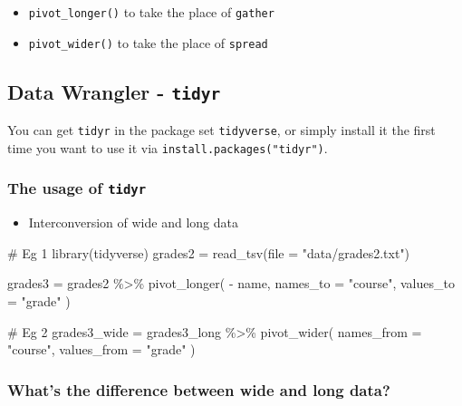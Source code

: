 \documentclass[
]{article}
\newenvironment{Shaded}{}{}
\newcommand{\NormalTok}[1]{#1}
\begin{document}
\begin{itemize}
\item
  \texttt{pivot\_longer()} to take the place of \texttt{gather}
\item
  \texttt{pivot\_wider()} to take the place of \texttt{spread}
\end{itemize}

\hypertarget{data-wrangler---tidyr}{%
\subsection{\texorpdfstring{Data Wrangler -
\texttt{tidyr}}{Data Wrangler - tidyr}}\label{data-wrangler---tidyr}}

You can get \texttt{tidyr} in the package set \texttt{tidyverse}, or
simply install it the first time you want to use it via
\texttt{install.packages("tidyr")}.

\hypertarget{the-usage-of-tidyr}{%
\subsubsection{\texorpdfstring{The usage of
\texttt{tidyr}}{The usage of tidyr}}\label{the-usage-of-tidyr}}

\begin{itemize}
\item
  Interconversion of wide and long data
\end{itemize}

\begin{Shaded}
\begin{Highlighting}[]
\NormalTok{\# Eg 1}
\NormalTok{library(tidyverse)}
\NormalTok{grades2 =}
\NormalTok{	read\_tsv(file = "data/grades2.txt")}

\NormalTok{grades3 =}
\NormalTok{	grades2 \%\textgreater{}\% }
\NormalTok{	pivot\_longer( }
\NormalTok{    {-} name,}
\NormalTok{    names\_to = "course",}
\NormalTok{    values\_to = "grade"}
\NormalTok{  )}

\NormalTok{\# Eg 2}
\NormalTok{grades3\_wide = grades3\_long \%\textgreater{}\% }
\NormalTok{  pivot\_wider(}
\NormalTok{    names\_from = "course",}
\NormalTok{    values\_from = "grade"}
\NormalTok{  )}
\end{Highlighting}
\end{Shaded}

\hypertarget{whats-the-difference-between-wide-and-long-data}{%
\subsubsection{What's the difference between wide and long
data?}\label{whats-the-difference-between-wide-and-long-data}}
\end{document}
